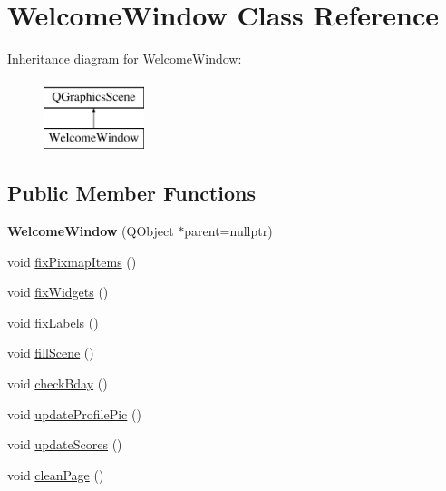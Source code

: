 \hypertarget{classWelcomeWindow}{\section{Welcome\-Window Class Reference}
\label{classWelcomeWindow}
}
Inheritance diagram for Welcome\-Window\-:\begin{figure}[H]
\begin{center}
\leavevmode
\includegraphics[height=2.000000cm]{classWelcomeWindow}
\end{center}
\end{figure}
\subsection*{Public Member Functions}
\begin{DoxyCompactItemize}
\item 
\hypertarget{classWelcomeWindow_a2f8c0bb7ffe56a2a27f5fd3d43518c39}{{\bfseries Welcome\-Window} (Q\-Object $\ast$parent=nullptr)}\label{classWelcomeWindow_a2f8c0bb7ffe56a2a27f5fd3d43518c39}

\item 
void \hyperlink{classWelcomeWindow_ad367652cb1e5ad31409d458f3bafb043}{fix\-Pixmap\-Items} ()
\item 
void \hyperlink{classWelcomeWindow_a0f4ffd1e10871df8d44702efb6566a86}{fix\-Widgets} ()
\item 
void \hyperlink{classWelcomeWindow_a92c93c12c2de7f24ee6fea83b099a548}{fix\-Labels} ()
\item 
void \hyperlink{classWelcomeWindow_a9bd72538fefc87e5cad3a5931529c868}{fill\-Scene} ()
\item 
void \hyperlink{classWelcomeWindow_a1fe8b2a01a787dd0f7f7da0c3bf2f309}{check\-Bday} ()
\item 
void \hyperlink{classWelcomeWindow_aa2525422faa9826e5719a81bdbf7c197}{update\-Profile\-Pic} ()
\item 
void \hyperlink{classWelcomeWindow_a7907ba084c2f59b8be82086cc5a48093}{update\-Scores} ()
\item 
void \hyperlink{classWelcomeWindow_aaa915a1d2bffe88b815d0c8fcdcc7734}{clean\-Page} ()
\end{DoxyCompactItemize}
